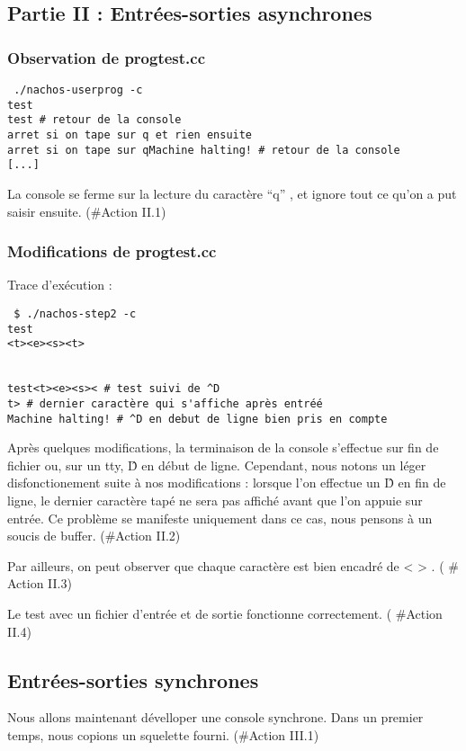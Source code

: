 \documentclass[a4paper,10pt]{article}
\begin{document}
\subsection{Partie II : Entrées-sorties asynchrones}
\subsubsection{Observation de progtest.cc}
\begin{verbatim}
 ./nachos-userprog -c
test
test # retour de la console
arret si on tape sur q et rien ensuite
arret si on tape sur qMachine halting! # retour de la console
[...]
\end{verbatim}
La console se ferme sur la lecture du caractère ``q'' , et ignore tout ce qu'on a put saisir ensuite. (\#Action II.1)

\subsubsection{ Modifications de progtest.cc}

Trace d'exécution :


\begin{verbatim}
 $ ./nachos-step2 -c
test
<t><e><s><t>


test<t><e><s>< # test suivi de ^D
t> # dernier caractère qui s'affiche après entréé
Machine halting! # ^D en debut de ligne bien pris en compte

\end{verbatim}

Après quelques modifications, la terminaison de la console s'effectue sur fin de fichier ou, sur un tty, \^D en début de ligne.
Cependant, nous notons un léger disfonctionement suite à nos modifications : lorsque l'on effectue un \^D en fin de ligne, le dernier caractère tapé ne sera pas affiché
avant que l'on appuie sur entrée. Ce problème se manifeste uniquement dans ce cas, nous pensons à un soucis de buffer. (\#Action II.2)

Par ailleurs, on peut observer que chaque caractère est bien encadré de < > . ( \# Action II.3)

Le test avec un fichier d'entrée et de sortie fonctionne correctement. ( \#Action II.4)
\newpage
\subsection{Entrées-sorties synchrones}
Nous allons maintenant dévelloper une console synchrone. Dans un premier temps, nous copions un squelette fourni. (\#Action III.1)
\end{document}

